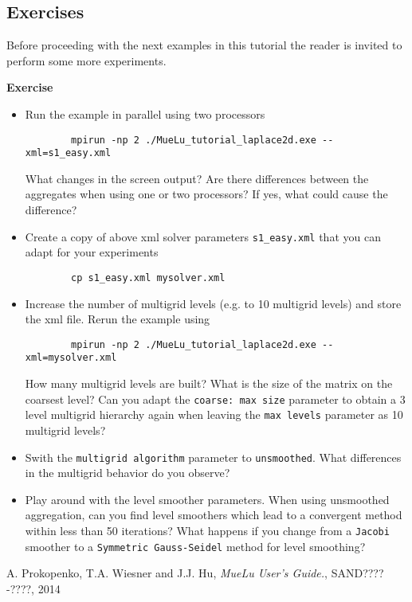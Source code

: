 \documentclass{article}
\begin{document}
\subsection{Exercises}

Before proceeding with the next examples in this tutorial the reader is invited to perform some more experiments.

\begin{graybox}
 \textbf{Exercise}
 \begin{itemize}
  \item Run the example in parallel using two processors
        \begin{verbatim}
        mpirun -np 2 ./MueLu_tutorial_laplace2d.exe --xml=s1_easy.xml
        \end{verbatim}
        What changes in the screen output? Are there differences between the aggregates when using one or two processors? If yes, what could cause the difference?
  \item Create a copy of above xml solver parameters \verb|s1_easy.xml| that you can adapt for your experiments
        \begin{verbatim}
        cp s1_easy.xml mysolver.xml
        \end{verbatim}
  \item Increase the number of multigrid levels (e.g. to 10 multigrid levels) and store the xml file. Rerun the example using
        \begin{verbatim}
        mpirun -np 2 ./MueLu_tutorial_laplace2d.exe --xml=mysolver.xml
        \end{verbatim}
        How many multigrid levels are built? What is the size of the matrix on the coarsest level? Can you adapt the \texttt{coarse: max size} parameter to obtain a 3 level multigrid hierarchy again when leaving the \texttt{max levels} parameter as 10 multigrid levels?
  \item Swith the \texttt{multigrid algorithm} parameter to \texttt{unsmoothed}. What differences in the multigrid behavior do you observe?
  \item Play around with the level smoother parameters. When using unsmoothed aggregation, can you find level smoothers which lead to a convergent method within less than 50 iterations? What happens if you change from a \texttt{Jacobi} smoother to a \texttt{Symmetric Gauss-Seidel} method for level smoothing?
  \end{itemize}
\end{graybox}

\begin{thebibliography}{9}
 A. Prokopenko, T.A. Wiesner and J.J. Hu, \emph{MueLu User's Guide.}, SAND????-????, 2014
\end{thebibliography}
\end{document}
